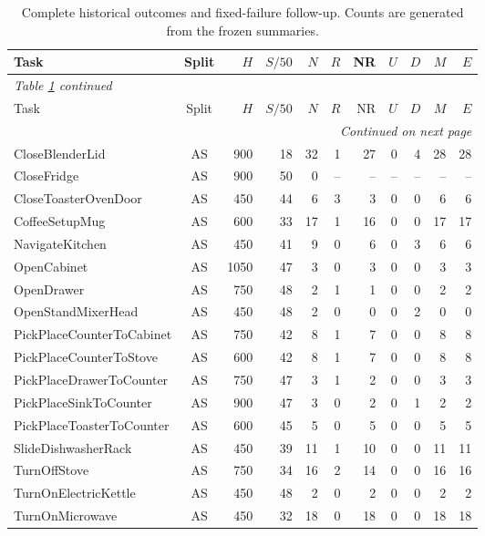 \begingroup
\footnotesize
\setlength{\tabcolsep}{5pt}
\begin{longtable}{@{}lcrrrrrrrrr@{}}
\caption{Complete historical outcomes and fixed-failure follow-up. Counts are generated from the frozen summaries.}\label{s:tab:tasks}\\
\toprule
Task & Split & $H$ & $S/50$ & $N$ & $R$ & NR & $U$ & $D$ & $M$ & $E$ \\
\midrule
\endfirsthead
\multicolumn{11}{l}{\textit{Table \ref{s:tab:tasks} continued}}\\
\toprule
Task & Split & $H$ & $S/50$ & $N$ & $R$ & NR & $U$ & $D$ & $M$ & $E$ \\
\midrule
\endhead
\midrule
\multicolumn{11}{r}{\textit{Continued on next page}}\\
\endfoot
\bottomrule
\endlastfoot
CloseBlenderLid & AS & 900 & 18 & 32 & 1 & 27 & 0 & 4 & 28 & 28 \\
CloseFridge & AS & 900 & 50 & 0 & -- & -- & -- & -- & -- & -- \\
CloseToasterOvenDoor & AS & 450 & 44 & 6 & 3 & 3 & 0 & 0 & 6 & 6 \\
CoffeeSetupMug & AS & 600 & 33 & 17 & 1 & 16 & 0 & 0 & 17 & 17 \\
NavigateKitchen & AS & 450 & 41 & 9 & 0 & 6 & 0 & 3 & 6 & 6 \\
OpenCabinet & AS & 1050 & 47 & 3 & 0 & 3 & 0 & 0 & 3 & 3 \\
OpenDrawer & AS & 750 & 48 & 2 & 1 & 1 & 0 & 0 & 2 & 2 \\
OpenStandMixerHead & AS & 450 & 48 & 2 & 0 & 0 & 0 & 2 & 0 & 0 \\
PickPlaceCounterToCabinet & AS & 750 & 42 & 8 & 1 & 7 & 0 & 0 & 8 & 8 \\
PickPlaceCounterToStove & AS & 600 & 42 & 8 & 1 & 7 & 0 & 0 & 8 & 8 \\
PickPlaceDrawerToCounter & AS & 750 & 47 & 3 & 1 & 2 & 0 & 0 & 3 & 3 \\
PickPlaceSinkToCounter & AS & 900 & 47 & 3 & 0 & 2 & 0 & 1 & 2 & 2 \\
PickPlaceToasterToCounter & AS & 600 & 45 & 5 & 0 & 5 & 0 & 0 & 5 & 5 \\
SlideDishwasherRack & AS & 450 & 39 & 11 & 1 & 10 & 0 & 0 & 11 & 11 \\
TurnOffStove & AS & 750 & 34 & 16 & 2 & 14 & 0 & 0 & 16 & 16 \\
TurnOnElectricKettle & AS & 450 & 48 & 2 & 0 & 2 & 0 & 0 & 2 & 2 \\
TurnOnMicrowave & AS & 450 & 32 & 18 & 0 & 18 & 0 & 0 & 18 & 18 \\

\end{longtable}
